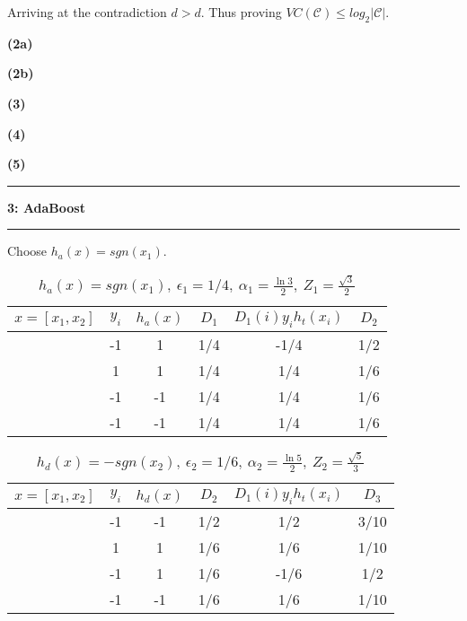 \documentclass[11pt]{article}
\newcommand\question[2]{\vspace{.25in}\hrule\textbf{#1: #2}\vspace{.5em}\hrule\vspace{.10in}}
\renewcommand\part[1]{\vspace{.10in}\textbf{(#1)}}
\begin{document}
Arriving at the contradiction $d > d$. Thus proving $VC(\mathcal{C}) \leq log_2|\mathcal{C}|$.

\part{2a}

\part{2b}

\part{3}

\part{4}

\part{5}

\question{3}{AdaBoost}

Choose $h_a(x) = sgn(x_1)$.  

\begin{table}[H]
\centering
{\renewcommand{\arraystretch}{1.2}%
\begin{tabular}{| c | c | c | c | c | c |}
\hline
$x = [x_1, x_2]$& $y_i$ & $h_a(x)$ & $D_1$ & $D_1(i)y_ih_t(x_i)$ & $D_2$\\
\hline
[1,1] & -1 & 1 & 1/4 & -1/4 & 1/2\\ \hline
[1,-1] & 1 & 1 & 1/4 & 1/4 & 1/6\\ \hline
[-1,-1] & -1 & -1 & 1/4 & 1/4 & 1/6\\ \hline
[-1,1] & -1 & -1 & 1/4 & 1/4 & 1/6\\ \hline
\end{tabular}}
\caption{$h_a(x) = sgn(x_1), \ \epsilon_1 = 1/4, \ \alpha_1 = \frac{\ln3}{2}, \ Z_1 = \frac{\sqrt{3}}{2}$}
\end{table}

\begin{table}[H]
\centering
{\renewcommand{\arraystretch}{1.2}%
\begin{tabular}{| c | c | c | c | c | c |}
\hline
$x = [x_1, x_2]$& $y_i$ & $h_d(x)$ & $D_2$ & $D_1(i)y_ih_t(x_i)$ & $D_3$\\
\hline
[1,1] & -1 & -1 & 1/2 &  1/2& 3/10\\ \hline
[1,-1] & 1 &  1&  1/6&  1/6& 1/10\\ \hline
[-1,-1] & -1 & 1 & 1/6&  -1/6& 1/2\\ \hline
[-1,1] & -1 & -1 &  1/6&  1/6& 1/10\\ \hline
\end{tabular}}
\caption{$h_d(x) = -sgn(x_2), \ \epsilon_2 = 1/6, \ \alpha_2 = \frac{\ln5}{2}, \ Z_2 = \frac{\sqrt{5}}{3}$}
\end{table}
\end{document}
